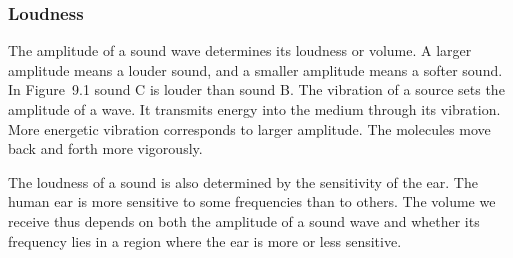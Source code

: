             \subsubsection{Loudness}
            \nopagebreak
        \label{m38799*id183826}The amplitude of a sound wave determines its loudness or volume. A larger amplitude means a louder sound, and a smaller amplitude means a softer sound. In Figure~9.1 sound C is louder than sound B. The vibration of a source sets the amplitude of a wave. It transmits energy into the medium through its vibration. More energetic vibration corresponds to larger amplitude. The molecules move back and forth more vigorously.\par 
        \label{m38799*id183839}The loudness of a sound is also determined by the sensitivity of the ear. The human ear is more sensitive to some frequencies than to others. The volume we receive thus depends on both the amplitude of a sound wave and whether its frequency lies in a region where the ear is more or less sensitive.\par 
      \label{m38799*uid5}
\label{m38799*secfhsst!!!underscore!!!id167}


